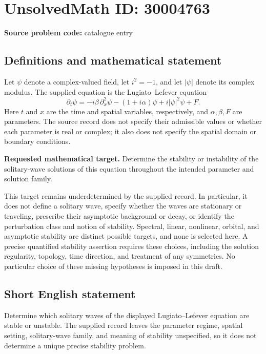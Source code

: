 \documentclass[11pt]{article}
\begin{document}
\section*{UnsolvedMath ID: 30004763}
\textbf{Source problem code:} catalogue entry
\subsection{Definitions and mathematical statement}
Let \(\psi\) denote a complex-valued field, let \(i^2=-1\), and let \(|\psi|\) denote its complex modulus. The supplied equation is the Lugiato--Lefever equation
\[
\partial_t\psi=-i\beta\,\partial_x^2\psi-(1+i\alpha)\psi+i|\psi|^2\psi+F.
\]
Here \(t\) and \(x\) are the time and spatial variables, respectively, and \(\alpha,\beta,F\) are parameters. The source record does not specify their admissible values or whether each parameter is real or complex; it also does not specify the spatial domain or boundary conditions.

\textbf{Requested mathematical target.} Determine the stability or instability of the solitary-wave solutions of this equation throughout the intended parameter and solution family.

This target remains underdetermined by the supplied record. In particular, it does not define a solitary wave, specify whether the waves are stationary or traveling, prescribe their asymptotic background or decay, or identify the perturbation class and notion of stability. Spectral, linear, nonlinear, orbital, and asymptotic stability are distinct possible targets, and none is selected here. A precise quantified stability assertion requires these choices, including the solution regularity, topology, time direction, and treatment of any symmetries. No particular choice of these missing hypotheses is imposed in this draft.
\subsection{Short English statement}
Determine which solitary waves of the displayed Lugiato--Lefever equation are stable or unstable. The supplied record leaves the parameter regime, spatial setting, solitary-wave family, and meaning of stability unspecified, so it does not determine a unique precise stability problem.
\end{document}
